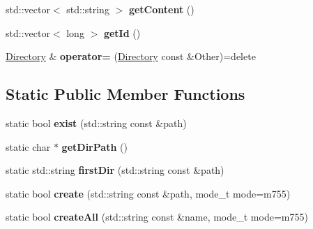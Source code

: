 \begin{DoxyCompactItemize}
\item 
\hypertarget{classstb_1_1Directory_acd36dbedc7eb3237074e1474a36f3551}{std\+::vector$<$ std\+::string $>$ {\bfseries get\+Content} ()}\label{classstb_1_1Directory_acd36dbedc7eb3237074e1474a36f3551}

\item 
\hypertarget{classstb_1_1Directory_a33d5d8783586acb418f7dda5c6056fde}{std\+::vector$<$ long $>$ {\bfseries get\+Id} ()}\label{classstb_1_1Directory_a33d5d8783586acb418f7dda5c6056fde}

\item 
\hypertarget{classstb_1_1Directory_a309e05c57a6c8f295c25895de76017a0}{\hyperlink{classstb_1_1Directory}{Directory} \& {\bfseries operator=} (\hyperlink{classstb_1_1Directory}{Directory} const \&Other)=delete}\label{classstb_1_1Directory_a309e05c57a6c8f295c25895de76017a0}

\end{DoxyCompactItemize}
\subsection*{Static Public Member Functions}
\begin{DoxyCompactItemize}
\item 
\hypertarget{classstb_1_1Directory_a0aff5cae22ea359272fe8456ff5685fd}{static bool {\bfseries exist} (std\+::string const \&path)}\label{classstb_1_1Directory_a0aff5cae22ea359272fe8456ff5685fd}

\item 
\hypertarget{classstb_1_1Directory_af7d3788f3b54a26b7af454feb53458b2}{static char $\ast$ {\bfseries get\+Dir\+Path} ()}\label{classstb_1_1Directory_af7d3788f3b54a26b7af454feb53458b2}

\item 
\hypertarget{classstb_1_1Directory_af9bc2e3ecaf8bfbd739b82afa48db0e5}{static std\+::string {\bfseries first\+Dir} (std\+::string const \&path)}\label{classstb_1_1Directory_af9bc2e3ecaf8bfbd739b82afa48db0e5}

\item 
\hypertarget{classstb_1_1Directory_aa0a7e237f7dcf4b1302d96153d3db33e}{static bool {\bfseries create} (std\+::string const \&path, mode\+\_\+t mode=m755)}\label{classstb_1_1Directory_aa0a7e237f7dcf4b1302d96153d3db33e}

\item 
\hypertarget{classstb_1_1Directory_ac6b7591f0674483e43344f457d62098c}{static bool {\bfseries create\+All} (std\+::string const \&name, mode\+\_\+t mode=m755)}\label{classstb_1_1Directory_ac6b7591f0674483e43344f457d62098c}

\end{DoxyCompactItemize}
